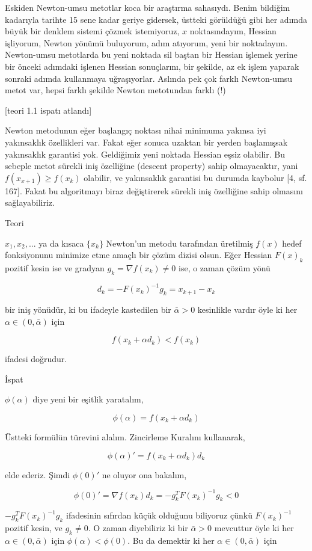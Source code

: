 \documentclass[12pt,fleqn]{article}\usepackage{../../common}
\begin{document}
Eskiden Newton-umsu metotlar koca bir araştırma sahasıydı. Benim bildiğim
kadarıyla tarihte 15 sene kadar geriye gidersek, üstteki görüldüğü gibi her
adımda büyük bir denklem sistemi çözmek istemiyoruz, $x$ noktasındayım,
Hessian işliyorum, Newton yönümü buluyorum, adım atıyorum, yeni bir
noktadayım. Newton-umsu metotlarda bu yeni noktada sil baştan bir Hessian
işlemek yerine bir önceki adımdaki işlenen Hessian sonuçlarını, bir
şekilde, az ek işlem yaparak sonraki adımda kullanmaya uğraşıyorlar.
Aslında pek çok farklı Newton-umsu metot var, hepsi farklı şekilde Newton
metotundan farklı (!)

[teori 1.1 ispatı atlandı]

Newton metodunun eğer başlangıç noktası nihai minimuma yakınsa iyi
yakınsaklık özellikleri var. Fakat eğer sonuca uzaktan bir yerden
başlamışsak yakınsaklık garantisi yok. Geldiğimiz yeni noktada Hessian
eşsiz olabilir. Bu sebeple metot sürekli iniş özelliğine (descent property)
sahip olmayacaktır, yani $f(x_{x+1}) \ge f(x_k)$ olabilir, ve yakınsaklık
garantisi bu durumda kaybolur [4, sf. 167]. Fakat bu algoritmayı biraz
değiştirerek sürekli iniş özelliğine sahip olmasını sağlayabiliriz. 

Teori

$x_1,x_2,...$ ya da kısaca $\{x_k\}$ Newton'un metodu tarafından üretilmiş
$f(x)$ hedef fonksiyonunu minimize etme amaçlı bir çözüm dizisi olsun. Eğer
Hessian $F(x)_k$ pozitif kesin ise ve gradyan $g_k = \nabla f(x_k) \ne 0$
ise, o zaman çözüm yönü

$$
d_k = -F(x_k)^{-1} g_k = x_{k+1} - x_k
$$

bir iniş yönüdür, ki bu ifadeyle kastedilen bir $\bar{\alpha} > 0$
kesinlikle vardır öyle ki her $\alpha \in  (0,\bar{\alpha})$ için 

$$
f(x_k + \alpha d_k) < f(x_k)
$$

ifadesi doğrudur. 

İspat

$\phi(\alpha)$ diye yeni bir eşitlik yaratalım,

$$
\phi(\alpha) = f(x_k + \alpha d_k)
$$

Üstteki formülün türevini alalım. Zincirleme Kuralını kullanarak,

$$
\phi(\alpha)' = f(x_k + \alpha d_k) d_k
$$

elde ederiz. Şimdi $\phi(0)'$ ne oluyor ona bakalım,

$$
\phi(0)' = \nabla f(x_k) d_k = -g_k^T F(x_k) ^{-1} g_k < 0
$$

$-g_k^T F(x_k) ^{-1} g_k$ ifadesinin sıfırdan küçük olduğunu biliyoruz
çünkü $F(x_k) ^{-1}$ pozitif kesin, ve $g_k \ne 0$. O zaman diyebiliriz ki 
bir $\bar{\alpha} > 0$ mevcuttur öyle ki her $\alpha \in (0,\bar{\alpha})$
için $\phi(\alpha) < \phi(0)$. Bu da demektir ki her $\alpha \in
(0,\bar{\alpha})$ için
\end{document}
